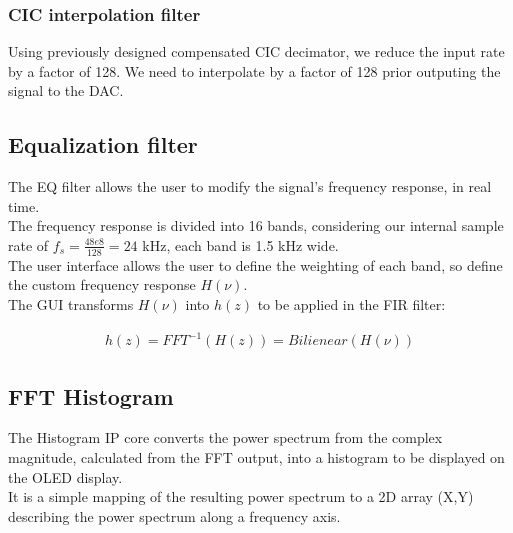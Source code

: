 \documentclass{article}
\begin{document}
\subsubsection{CIC interpolation filter}

Using previously designed compensated CIC decimator,
we reduce the input rate by a factor of 128.
We need to interpolate by a factor of 128 prior
outputing the signal to the DAC.


\newpage
\subsection{Equalization filter}

The EQ filter allows the user 
to modify the signal's frequency response,
in real time. \\

The frequency response is divided into 16 bands,
considering our internal sample rate of 
$f_s = \frac{48e8}{128} = 24$ kHz,
each band is 1.5 kHz wide. \\

The user interface allows the user
to define the weighting of each band,
so define the custom frequency response
$H(\nu)$. \\

The GUI transforms $H(\nu)$ into $h(z)$
to be applied in the FIR filter:

\begin{equation}
	\begin{split}
	h(z) = FFT^{-1}\left(H(z)\right) = Bilienear(H(\nu))
	\end{split}
\end{equation}

\newpage
\subsection{FFT Histogram}

The Histogram IP core converts
the power spectrum from the
complex magnitude, calculated from the
FFT output, into a 
histogram to be displayed on the OLED display. \\

It is a simple mapping of the resulting
power spectrum to a 2D array (X,Y) describing
the power spectrum along a frequency axis. \\ 

\end{document}

